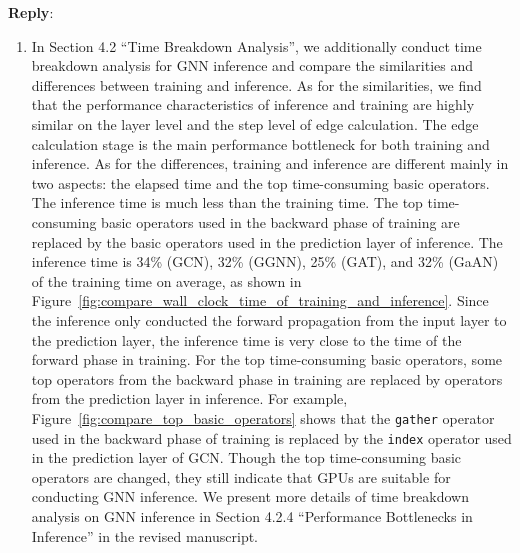 \documentclass[12pt]{article}
\newenvironment{reply}
   {\medskip \noindent \textbf{Reply}:\  }
   {\medskip}
\begin{document}
\begin{reply}
\begin{enumerate}
    \item In Section 4.2 ``Time Breakdown Analysis'', we additionally conduct time breakdown analysis for GNN inference and compare the similarities and differences between training and inference.
    As for the similarities, we find that the performance characteristics of inference and training are highly similar on the layer level and the step level of edge calculation.
    The edge calculation stage is the main performance bottleneck for both training and inference.
    As for the differences, training and inference are different mainly in two aspects: the elapsed time and the top time-consuming basic operators.
    The inference time is much less than the training time.
    The top time-consuming basic operators used in the backward phase of training are replaced by the basic operators used in the prediction layer of inference.
    The inference time is 34\% (GCN), 32\% (GGNN), 25\% (GAT), and 32\% (GaAN) of the training time on average, as shown in Figure~\ref{fig:compare_wall_clock_time_of_training_and_inference}.
    Since the inference only conducted the forward propagation from the input layer to the prediction layer, the inference time is very close to the time of the forward phase in training.
    For the top time-consuming basic operators, some top operators from the backward phase in training are replaced by operators from the prediction layer in inference.
    For example, Figure~\ref{fig:compare_top_basic_operators} shows that the \texttt{gather} operator used in the backward phase of training is replaced by the \texttt{index} operator used in the prediction layer of GCN.
    Though the top time-consuming basic operators are changed, they still indicate that GPUs are suitable for conducting GNN inference.
    We present more details of time breakdown analysis on GNN inference in Section 4.2.4 ``Performance Bottlenecks in Inference'' in the revised manuscript.
        

\end{enumerate}
\end{reply}
\end{document}

